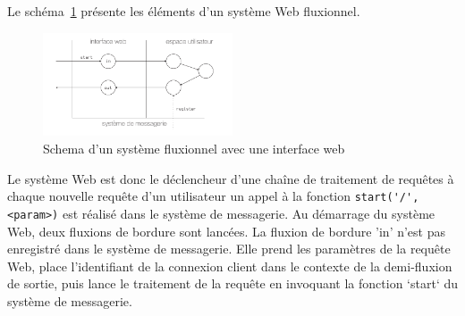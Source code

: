 Le schéma~\ref{fig:schemaweb} présente les éléments d'un système Web fluxionnel.

\begin{figure}[h!]
	\includegraphics[width=0.5\textwidth]{schema-web.pdf}
	\caption{Schema d'un système fluxionnel avec une interface web}
	\label{fig:schemaweb}
\end{figure}

Le système Web est donc le déclencheur d'une chaîne de traitement de requêtes à chaque nouvelle requête d'un utilisateur un appel à la fonction \lstinline|start('/', <param>)| est réalisé dans le système de messagerie.
Au démarrage du système Web, deux fluxions de bordure sont lancées.
La fluxion de bordure 'in' n'est pas enregistré dans le système de messagerie.
Elle prend les paramètres de la requête Web, place l'identifiant de la connexion client dans le contexte de la demi-fluxion de sortie, puis lance le traitement de la requête en invoquant la fonction `start` du système de messagerie.









